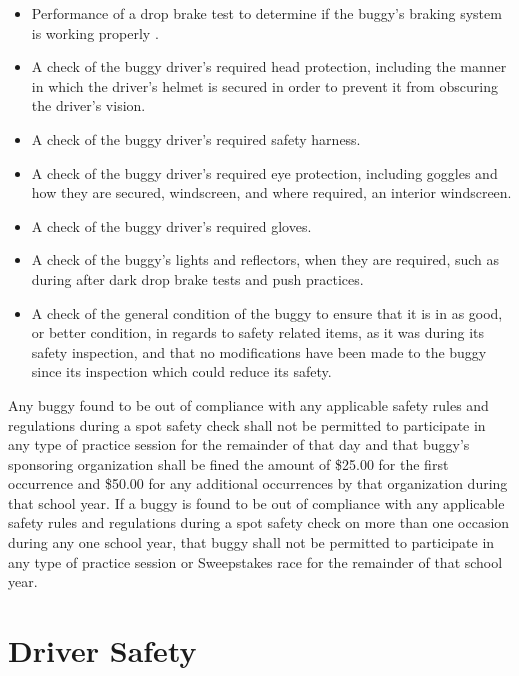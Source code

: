 	\begin{itemize}

		\item Performance of a drop brake test to determine if the buggy's braking
		system is working properly .

		\item A check of the buggy driver's required head protection, including the
		manner in which the driver's helmet is secured in order to prevent it from
		obscuring the driver's vision.

		\item A check of the buggy driver's required safety harness.

		\item A check of the buggy driver's required eye protection, including goggles
		and how they are secured, windscreen, and where required, an interior
		windscreen.

		\item A check of the buggy driver's required gloves.

		\item A check of the buggy's lights and reflectors, when they are required,
		such as during after dark drop brake tests and push practices.

		\item A check of the general condition of the buggy to ensure that it is in as
		good, or better condition, in regards to safety related items, as it was during
		its safety inspection, and that no modifications have been made to the buggy
		since its inspection which could reduce its safety.

	\end{itemize}

	Any buggy found to be out of compliance with any applicable safety rules and
	regulations during a spot safety check shall not be permitted to participate in
	any type of practice session for the remainder of that day and that buggy's
	sponsoring organization shall be fined the amount of \$25.00 for the first
	occurrence and \$50.00 for any additional occurrences by that organization
	during that school year. If a buggy is found to be out of compliance with any
	applicable safety rules and regulations during a spot safety check on more than
	one occasion during any one school year, that buggy shall not be permitted to
	participate in any type of practice session or Sweepstakes race for the
	remainder of that school year.

\section{Driver Safety}

